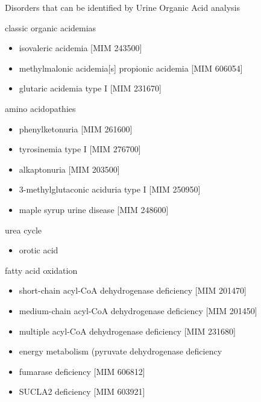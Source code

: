 \documentclass[presentation, smaller]{beamer}
\begin{document}
\begin{frame}[label={sec:orgheadline11}]{Disorders that can be identified by Urine Organic Acid analysis}
\begin{block}{classic organic acidemias}
\begin{itemize}
\item isovaleric acidemia [MIM 243500]
\item methylmalonic acidemia[s] propionic acidemia [MIM 606054]
\item glutaric acidemia type I [MIM 231670]
\end{itemize}
\end{block}
\begin{block}{amino acidopathies}
\begin{itemize}
\item phenylketonuria [MIM 261600]
\item tyrosinemia type I [MIM 276700]
\item alkaptonuria [MIM 203500]
\item 3-methylglutaconic aciduria type I [MIM 250950]
\item maple syrup urine disease [MIM 248600]
\end{itemize}
\end{block}
\begin{block}{urea cycle}
\begin{itemize}
\item orotic acid
\end{itemize}
\end{block}
\begin{block}{fatty acid oxidation}
\begin{itemize}
\item short-chain acyl-CoA dehydrogenase deficiency [MIM 201470]
\item medium-chain acyl-CoA dehydrogenase deficiency [MIM 201450]
\item multiple acyl-CoA dehydrogenase deficiency [MIM 231680]
\item energy metabolism (pyruvate dehydrogenase deficiency
\item fumarase deficiency [MIM 606812]
\item SUCLA2 deficiency [MIM 603921]
\end{itemize}
\end{block}
\end{frame}
\end{document}
